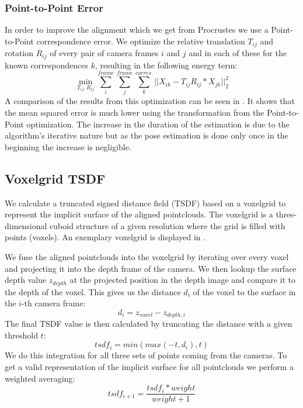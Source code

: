\documentclass[10pt,twocolumn,letterpaper]{article}
\begin{document}
\subsubsection{Point-to-Point Error}
In order to improve the alignment which we get from Procrustes we use a Point-to-Point correspondence error. We optimize the relative translation $T_{ij}$ and rotation $R_{ij}$ of every pair of camera frames $i$ and $j$ and in each of these for the known correspondences $k$, resulting in the following energy term:
\begin{equation}\label{eq5}
\min_{T_{ij}, R_{ij}} \sum_{i}^{frame}\sum_{j}^{frame}\sum_{k}^{corres.} || X_{ik} - T_{ij}R_{ij}*X_{jk} ||_2^2
\end{equation}
A comparison of the results from this optimization can be seen in . It shows that the mean squared error is much lower using the transformation from the Point-to-Point optimization. The increase in the duration of the estimation is due to the algorithm's iterative nature but as the pose estimation is done only once in the beginning the increase is negligible.
%
\subsection{Voxelgrid TSDF}
We calculate a truncated signed distance field (TSDF) based on a voxelgrid to represent the implicit surface of the aligned pointclouds. The voxelgrid is a three-dimensional cuboid structure of a given resolution where the grid is filled with points (voxels). An exemplary voxelgrid is displayed in . 

We fuse the aligned pointclouds into the voxelgrid by iterating over every voxel and projecting it into the depth frame of the camera. We then lookup the surface depth value $z_{depth}$ at the projected position in the depth image and compare it to the depth of the voxel. This gives us the distance $d_i$ of the voxel to the surface in the $i$-th camera frame:
\begin{equation}\label{eq1}
d_i = z_{voxel} - z_{depth,i}
\end{equation}
The final TSDF value is then calculated by truncating the distance with a given threshold $t$:
\begin{equation}
	tsdf_i = min(max(-t, d_i), t)
\end{equation}
We do this integration for all three sets of points coming from the cameras. To get a valid representation of the implicit surface for all pointclouds we perform a weighted averaging: 
\begin{equation}\label{eq2}
tsdf_{i+1}=\frac{tsdf_{i} * weight}{weight+1}
\end{equation}
\end{document}
